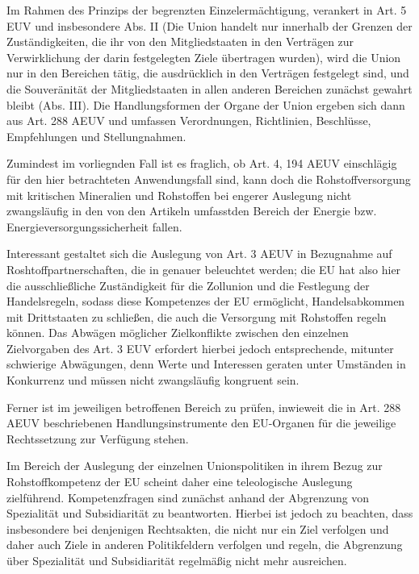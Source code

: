 \documentclass[12pt,a4paper,oneside]{book} %
\begin{document}
Im Rahmen des Prinzips der begrenzten Einzelermächtigung, verankert in Art. 5 EUV und insbesondere Abs. II (Die Union handelt nur innerhalb der Grenzen der Zuständigkeiten, die ihr von den Mitgliedstaaten in den Verträgen zur Verwirklichung der darin festgelegten Ziele übertragen wurden), wird die Union nur in den Bereichen tätig, die ausdrücklich in den Verträgen festgelegt sind, und  die Souveränität der Mitgliedstaaten in allen anderen Bereichen zunächst gewahrt bleibt (Abs. III).
Die Handlungsformen der Organe der Union ergeben sich dann aus Art. 288 AEUV und umfassen Verordnungen, Richtlinien, Beschlüsse, Empfehlungen und Stellungnahmen.
	
Zumindest im vorliegnden Fall ist es fraglich, ob Art. 4, 194 AEUV einschlägig für den hier betrachteten Anwendungsfall sind, kann doch die Rohstoffversorgung mit kritischen Mineralien und Rohstoffen bei engerer Auslegung nicht zwangsläufig in den von den Artikeln umfasstden Bereich der Energie bzw. Energieversorgungssicherheit fallen.
	
Interessant gestaltet sich die Auslegung von Art. 3 AEUV in Bezugnahme auf Roshtoffpartnerschaften, die in %
 genauer beleuchtet werden; die EU hat also hier die ausschließliche Zuständigkeit für die Zollunion und die Festlegung der Handelsregeln, sodass diese Kompetenzes der EU ermöglicht, Handelsabkommen mit Drittstaaten zu schließen, die auch die Versorgung mit Rohstoffen regeln können. Das Abwägen möglicher Zielkonflikte zwischen den einzelnen Zielvorgaben des Art. 3 EUV erfordert hierbei jedoch entsprechende, mitunter schwierige Abwägungen, denn Werte und Interessen geraten unter Umständen in Konkurrenz und müssen nicht zwangsläufig kongruent sein.\autocite{Müller-Ibold/Herrmann, EuZW 2022, 1029, 1030} 
	
Ferner ist im jeweiligen betroffenen Bereich zu prüfen, inwieweit die in Art. 288 AEUV beschriebenen Handlungsinstrumente den EU-Organen für die jeweilige Rechtssetzung zur Verfügung stehen.  
	
Im Bereich der Auslegung der einzelnen Unionspolitiken in ihrem Bezug zur Rohstoffkompetenz der EU scheint daher eine teleologische Auslegung zielführend. Kompetenzfragen sind zunächst anhand der Abgrenzung von Spezialität und Subsidiarität zu beantworten.\autocite{Callies, Berliner Beiträge 137, S. 39f.} Hierbei ist jedoch zu beachten, dass insbesondere bei denjenigen Rechtsakten, die nicht nur ein Ziel verfolgen und daher auch Ziele in anderen Politikfeldern verfolgen und regeln, die Abgrenzung über Spezialität und Subsidiarität regelmäßig nicht mehr ausreichen.\autocite{CITATIONNEEDED}
	
\end{document}
